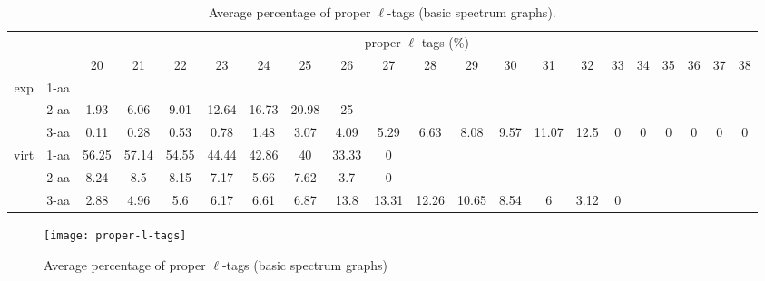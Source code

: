 \documentclass{article}[12pt]
\begin{document}
\begin{landscape}
\begin{table}[h]\tiny
\vspace{3mm}
{\centering
\begin{center}
\begin{tabular}{|c|l|c|c|c|c|c|c|c|c|c|c|c|c|c|c|c|c|c|c|c|}
  \hline
  \multicolumn{2}{|c|}{ } & \multicolumn{ 19 }{|c|}{ proper $\ell$-tags (\%)} \\
  \cline{3- 21}
  \multicolumn{2}{|c|}{ }  & 20 & 21 & 22 & 23 & 24 & 25 & 26 & 27 & 28 & 29 & 30 & 31 & 32 & 33 & 34 & 35 & 36 & 37 & 38\\
  \hline
  \multirow{3}{*}{exp}
&  1-aa  &  &  &  &  &  &  &  &  &  &  &  &  &  &  &  &  &  &  & \\
&  2-aa  & 1.93 & 6.06 & 9.01 & 12.64 & 16.73 & 20.98 & 25 &  &  &  &  &  &  &  &  &  &  &  & \\
&  3-aa  & 0.11 & 0.28 & 0.53 & 0.78 & 1.48 & 3.07 & 4.09 & 5.29 & 6.63 & 8.08 & 9.57 & 11.07 & 12.5 & 0 & 0 & 0 & 0 & 0 & 0\\
 \hline
  \multirow{3}{*}{virt} 
&  1-aa  & 56.25 & 57.14 & 54.55 & 44.44 & 42.86 & 40 & 33.33 & 0 &  &  &  &  &  &  &  &  &  &  & \\
&  2-aa  & 8.24 & 8.5 & 8.15 & 7.17 & 5.66 & 7.62 & 3.7 & 0 &  &  &  &  &  &  &  &  &  &  & \\
&  3-aa  & 2.88 & 4.96 & 5.6 & 6.17 & 6.61 & 6.87 & 13.8 & 13.31 & 12.26 & 10.65 & 8.54 & 6 & 3.12 & 0 &  &  &  &  & \\
 \hline
\end{tabular}
\end{center}
\par}
\centering
\caption{ Average percentage of proper $\ell$-tags (basic spectrum graphs).}
\label{table:proper-l-tags}
\vspace{3mm}
\end{table}

\end{landscape}

\begin{figure}
  \begin{center}
\texttt{[image: proper-l-tags]}
\end{center}
\caption{Average percentage of proper $\ell$-tags (basic spectrum graphs)}
  \label{fig:proper-l-tags}
\end{figure}
\end{document}
